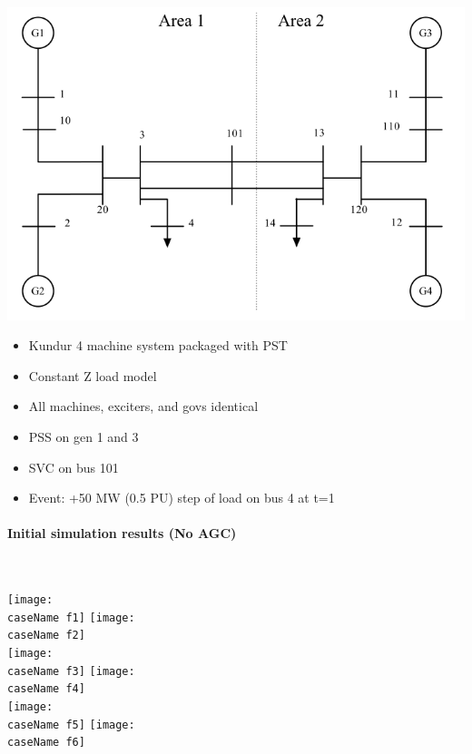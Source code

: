 \documentclass[12pt]{article}
\begin{document}
\begin{center}
\includegraphics[width=.75\linewidth]{sysOneLineAreas}
\end{center}
\begin{itemize}
\item Kundur  4 machine system packaged with PST
\item Constant Z load model
\item All machines, exciters, and govs identical
\item PSS on gen 1 and 3
\item SVC on bus 101
\item Event: +50 MW (0.5 PU) step of load on bus 4 at t=1
\end{itemize}

\pagebreak
\paragraph{Initial simulation results (No AGC)} \ \\


\begin{center}
\newcommand{\caseName}{NoAGC}
\texttt{[image: \\caseName f1]} %
\texttt{[image: \\caseName f2]} \\%
\texttt{[image: \\caseName f3]} %
\texttt{[image: \\caseName f4]} \\%
\texttt{[image: \\caseName f5]} %
\texttt{[image: \\caseName f6]} \\%
\end{center}

\end{document}
